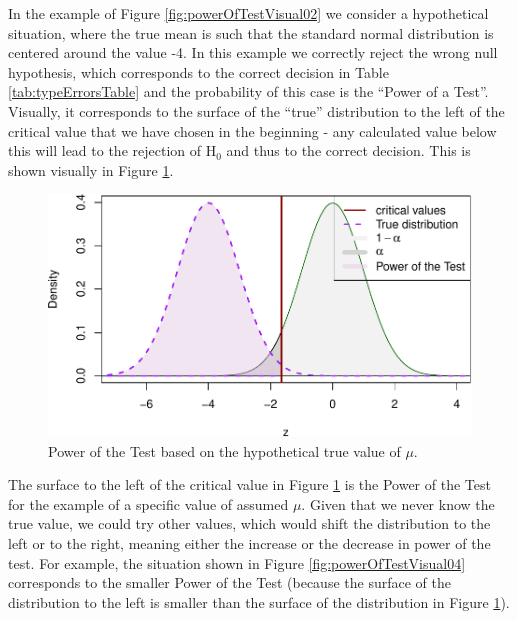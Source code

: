 \documentclass[
]{book}
\theoremstyle{definition}
\theoremstyle{definition}
\theoremstyle{definition}
\theoremstyle{definition}
\theoremstyle{remark}
\begin{document}
In the example of Figure \ref{fig:powerOfTestVisual02} we consider a hypothetical situation, where the true mean is such that the standard normal distribution is centered around the value -4. In this example we correctly reject the wrong null hypothesis, which corresponds to the correct decision in Table \ref{tab:typeErrorsTable} and the probability of this case is the ``Power of a Test''. Visually, it corresponds to the surface of the ``true'' distribution to the left of the critical value that we have chosen in the beginning - any calculated value below this will lead to the rejection of H\(_0\) and thus to the correct decision. This is shown visually in Figure \ref{fig:powerOfTestVisual03}.

\begin{figure}
\centering
\includegraphics{Svetunkov---Statistics-for-Business-Analytics_files/figure-latex/powerOfTestVisual03-1.pdf}
\caption{\label{fig:powerOfTestVisual03}Power of the Test based on the hypothetical true value of \(\mu\).}
\end{figure}

The surface to the left of the critical value in Figure \ref{fig:powerOfTestVisual03} is the Power of the Test for the example of a specific value of assumed \(\mu\). Given that we never know the true value, we could try other values, which would shift the distribution to the left or to the right, meaning either the increase or the decrease in power of the test. For example, the situation shown in Figure \ref{fig:powerOfTestVisual04} corresponds to the smaller Power of the Test (because the surface of the distribution to the left is smaller than the surface of the distribution in Figure \ref{fig:powerOfTestVisual03}).
\end{document}
